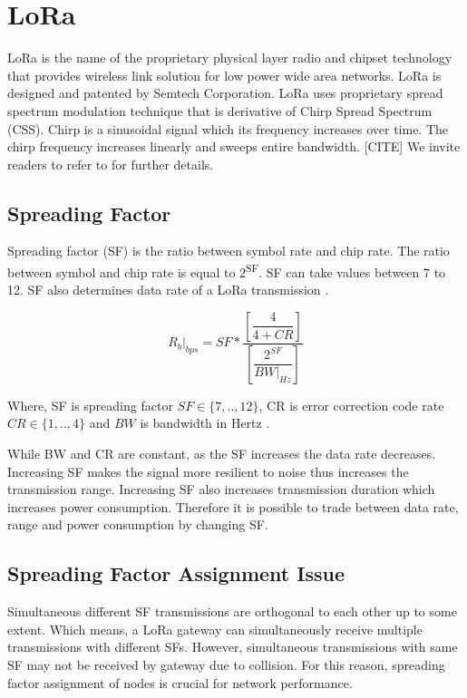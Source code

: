 \documentclass[conference]{IEEEtran}
\begin{document}
\section{LoRa}
\par LoRa is the name of the proprietary physical layer radio and chipset technology that provides wireless link solution for low power wide area networks. LoRa is designed and patented by Semtech Corporation. LoRa uses proprietary spread spectrum modulation technique that is derivative of Chirp Spread Spectrum (CSS). Chirp is a sinusoidal signal which its  frequency increases over time. The chirp frequency increases linearly and sweeps entire bandwidth. [CITE] We invite readers to refer to \cite{AN1200.22} for further details.

\subsection{Spreading Factor}
\par Spreading factor (SF) is the ratio between symbol rate and chip rate. The ratio between symbol and chip rate is equal to $2$\textsuperscript{SF}. SF can take values between 7 to 12. SF also determines data rate of a LoRa transmission \cite{AN1200.22}.

\begin{equation} \label{eq:bit_rate_sf}
R_{b}|_{bps} = SF * \dfrac{\left[ \dfrac{4}{4+CR} \right] }{ \left[ \dfrac{2^{SF}}{BW|_{Hz}} \right]}
\end{equation}

Where, SF is spreading factor $SF \in \{7,..,12\}$, CR is error correction code rate $CR \in \{1,..,4\}$ and $BW$ is bandwidth in Hertz \cite{AN1200.22}.

\par While BW and CR are constant, as the SF increases the data rate decreases. Increasing SF makes the signal more resilient to noise thus increases the transmission range. Increasing SF also increases transmission duration which increases power consumption. Therefore it is possible to trade between data rate, range and power consumption by  changing SF.

\subsection{Spreading Factor Assignment Issue}
\par Simultaneous different SF transmissions are orthogonal to each other up to some extent. Which means, a LoRa gateway can simultaneously receive multiple transmissions with different SFs. However, simultaneous transmissions with same SF may not be received by gateway due to collision. For this reason, spreading factor assignment of nodes is crucial for network performance.
\end{document}
